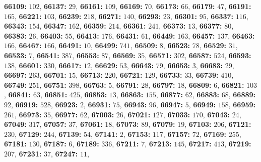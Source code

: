 \textsf{\bfseries 66109:} $102$, \textsf{\bfseries 66137:} $29$, \textsf{\bfseries 66161:} $109$, \textsf{\bfseries 66169:} $70$, \textsf{\bfseries 66173:} $66$, \textsf{\bfseries 66179:} $47$, \textsf{\bfseries 66191:} $165$, \textsf{\bfseries 66221:} $103$, \textsf{\bfseries 66239:} $218$, \textsf{\bfseries 66271:} $140$, \textsf{\bfseries 66293:} $23$, \textsf{\bfseries 66301:} $95$, \textsf{\bfseries 66337:} $116$, \textsf{\bfseries 66343:} $154$, \textsf{\bfseries 66347:} $162$, \textsf{\bfseries 66359:} $214$, \textsf{\bfseries 66361:} $241$, \textsf{\bfseries 66373:} $13$, \textsf{\bfseries 66377:} $80$, \textsf{\bfseries 66383:} $26$, \textsf{\bfseries 66403:} $55$, \textsf{\bfseries 66413:} $176$, \textsf{\bfseries 66431:} $61$, \textsf{\bfseries 66449:} $163$, \textsf{\bfseries 66457:} $137$, \textsf{\bfseries 66463:} $166$, \textsf{\bfseries 66467:} $166$, \textsf{\bfseries 66491:} $10$, \textsf{\bfseries 66499:} $741$, \textsf{\bfseries 66509:} $8$, \textsf{\bfseries 66523:} $78$, \textsf{\bfseries 66529:} $31$, \textsf{\bfseries 66533:} $7$, \textsf{\bfseries 66541:} $387$, \textsf{\bfseries 66553:} $87$, \textsf{\bfseries 66569:} $35$, \textsf{\bfseries 66571:} $302$, \textsf{\bfseries 66587:} $524$, \textsf{\bfseries 66593:} $138$, \textsf{\bfseries 66601:} $330$, \textsf{\bfseries 66617:} $12$, \textsf{\bfseries 66629:} $53$, \textsf{\bfseries 66643:} $79$, \textsf{\bfseries 66653:} $3$, \textsf{\bfseries 66683:} $29$, \textsf{\bfseries 66697:} $263$, \textsf{\bfseries 66701:} $15$, \textsf{\bfseries 66713:} $220$, \textsf{\bfseries 66721:} $129$, \textsf{\bfseries 66733:} $33$, \textsf{\bfseries 66739:} $410$, \textsf{\bfseries 66749:} $251$, \textsf{\bfseries 66751:} $398$, \textsf{\bfseries 66763:} $5$, \textsf{\bfseries 66791:} $28$, \textsf{\bfseries 66797:} $18$, \textsf{\bfseries 66809:} $6$, \textsf{\bfseries 66821:} $103$, \textsf{\bfseries 66841:} $63$, \textsf{\bfseries 66851:} $425$, \textsf{\bfseries 66853:} $13$, \textsf{\bfseries 66863:} $155$, \textsf{\bfseries 66877:} $62$, \textsf{\bfseries 66883:} $68$, \textsf{\bfseries 66889:} $92$, \textsf{\bfseries 66919:} $528$, \textsf{\bfseries 66923:} $2$, \textsf{\bfseries 66931:} $75$, \textsf{\bfseries 66943:} $96$, \textsf{\bfseries 66947:} $5$, \textsf{\bfseries 66949:} $158$, \textsf{\bfseries 66959:} $261$, \textsf{\bfseries 66973:} $35$, \textsf{\bfseries 66977:} $62$, \textsf{\bfseries 67003:} $26$, \textsf{\bfseries 67021:} $127$, \textsf{\bfseries 67033:} $170$, \textsf{\bfseries 67043:} $24$, \textsf{\bfseries 67049:} $317$, \textsf{\bfseries 67057:} $37$, \textsf{\bfseries 67061:} $18$, \textsf{\bfseries 67073:} $89$, \textsf{\bfseries 67079:} $19$, \textsf{\bfseries 67103:} $206$, \textsf{\bfseries 67121:} $230$, \textsf{\bfseries 67129:} $244$, \textsf{\bfseries 67139:} $54$, \textsf{\bfseries 67141:} $2$, \textsf{\bfseries 67153:} $117$, \textsf{\bfseries 67157:} $72$, \textsf{\bfseries 67169:} $255$, \textsf{\bfseries 67181:} $130$, \textsf{\bfseries 67187:} $6$, \textsf{\bfseries 67189:} $336$, \textsf{\bfseries 67211:} $7$, \textsf{\bfseries 67213:} $145$, \textsf{\bfseries 67217:} $413$, \textsf{\bfseries 67219:} $207$, \textsf{\bfseries 67231:} $37$, \textsf{\bfseries 67247:} $11$, 
